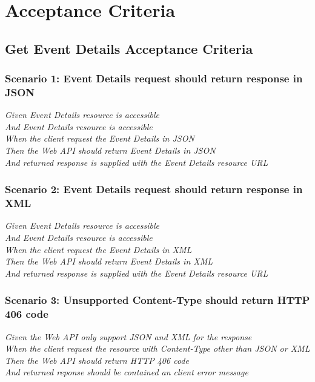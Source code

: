 \documentclass[a4paper, 12pt, oneside]{report}
\begin{document}
\appendix
\chapter{Acceptance Criteria} \label{lampiran:a}
\section{Get Event Details Acceptance Criteria}
\subsection{Scenario 1: Event Details request should return response in JSON}

\onehalfspacing \textit{Given Event Details resource is accessible\\
And Event Details resource is accessible\\
When the client request the Event Details in JSON\\
Then the Web API should return Event Details in JSON\\
And returned response is supplied with the Event Details resource URL\\}

\subsection{Scenario 2: Event Details request should return response in XML}

\onehalfspacing \textit{Given Event Details resource is accessible\\
And Event Details resource is accessible\\
When the client request the Event Details in XML\\
Then the Web API should return Event Details in XML\\
And returned response is supplied with the Event Details resource URL\\}

\subsection{Scenario 3: Unsupported Content-Type should return HTTP 406 code}

\onehalfspacing \textit{Given the Web API only support JSON and XML for the response\\
When the client request the resource with Content-Type other than JSON or XML\\
Then the Web API should return HTTP 406 code\\
And returned reponse should be contained an client error message}
\end{document}
